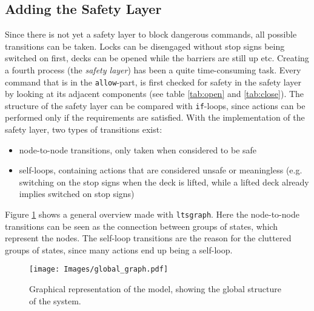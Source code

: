 \subsection{Adding the Safety Layer}
\label{sec:safety}
Since there is not yet a safety layer to block dangerous commands, all possible transitions can be taken. Locks can be disengaged without stop signs being switched on first, decks can be opened while the barriers are still up etc. Creating a fourth process (the \emph{safety layer}) has been a quite time-consuming task. Every command that is in the \texttt{allow}-part, is first checked for safety in the safety layer by looking at its adjacent components (see table \ref{tab:open} and \ref{tab:close}). The structure of the safety layer can be compared with \texttt{if}-loops, since actions can be performed only if the requirements are satisfied. With the implementation of the safety layer, two types of transitions exist:
%
\begin{itemize}
	\item node-to-node transitions, only taken when considered to be safe
	\item self-loops, containing actions that are considered unsafe or meaningless (e.g. switching on the stop signs when the deck is lifted, while a lifted deck already implies switched on stop signs)
\end{itemize}
%
Figure \ref{fig:global} shows a general overview made with \texttt{ltsgraph}. Here the node-to-node transitions can be seen as the connection between groups of states, which represent the nodes. The self-loop transitions are the reason for the cluttered groups of states, since many actions end up being a self-loop.
%
\begin{figure}[htb]
\centering
\texttt{[image: Images/global\_graph.pdf]}
\caption{Graphical representation of the model, showing the global structure of the system.}%
\label{fig:global}
\end{figure}%
%
